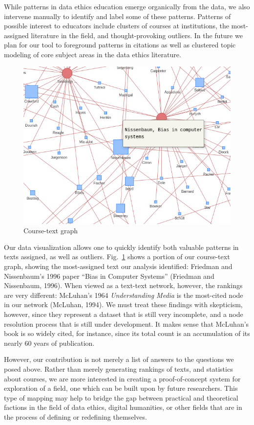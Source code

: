 \documentclass[
]{article}
\begin{document}
While patterns in data ethics education emerge organically from the
data, we also intervene manually to identify and label some of these
patterns. Patterns of possible interest to educators include clusters of
courses at institutions, the most-assigned literature in the field, and
thought-provoking outliers. In the future we plan for our tool to
foreground patterns in citations as well as clustered topic modeling of
core subject areas in the data ethics literature.

\begin{figure}
\hypertarget{fig:graph}{%
\centering
\includegraphics{course-text.jpg}
\caption{Course-text graph}\label{fig:graph}
}
\end{figure}

Our data visualization allows one to quickly identify both valuable
patterns in texts assigned, as well as outliers. Fig.~\ref{fig:graph}
shows a portion of our course-text graph, showing the most-assigned text
our analysis identified: Friedman and Nissenbaum's 1996 paper ``Bias in
Computer Systems'' (Friedman and Nissenbaum, 1996). When viewed as a
text-text network, however, the rankings are very different: McLuhan's
1964 \emph{Understanding Media} is the most-cited node in our network
(McLuhan, 1994). We must treat these findings with skepticism, however,
since they represent a dataset that is still very incomplete, and a node
resolution process that is still under development. It makes sense that
McLuhan's book is so widely cited, for instance, since its total count
is an accumulation of its nearly 60 years of publication.

However, our contribution is not merely a list of answers to the
questions we posed above. Rather than merely generating rankings of
texts, and statistics about courses, we are more interested in creating
a proof-of-concept system for exploration of a field, one which can be
built upon by future researchers. This type of mapping may help to
bridge the gap between practical and theoretical factions in the field
of data ethics, digital humanities, or other fields that are in the
process of defining or redefining themselves.
\end{document}
